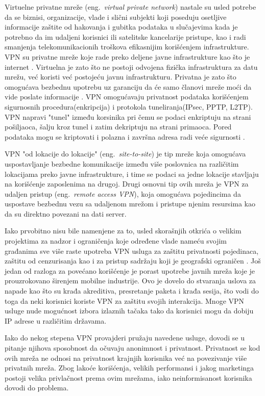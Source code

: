 \documentclass[a4paper]{article}
\begin{document}
Virtuelne privatne mreže (eng.~{\em virtual private network}) nastale su usled potrebe da se biznisi, organizacije, vlade i slični subjekti koji poseduju osetljive informacije zaštite od hakovanja i gubitka podataka u slučajevima kada je potrebno da im udaljeni korisnici ili satelitske kancelarije pristupe, kao i radi smanjenja telekomunikacionih troškova efikasnijim korišćenjem infrastrukture. VPN su privatne mreže koje rade preko deljene javne infrastrukture kao što je internet \cite{vpn2}. Virtuelna je zato što ne postoji odvojena fizička infrastruktura za datu mrežu, već koristi već postojeću javnu infrastrukturu. Privatna je zato što  omogućava bezbednu upotrebu uz garanciju da će samo članovi mreže moći da vide poslate informacije \cite{vpn3}. VPN omogućavaju privatnost podataka korišćenjem sigurnosnih procedura(enkripcija)  i  protokola tuneliranja(IPsec, PPTP, L2TP). VPN napravi "tunel"  između korsinika pri čemu se podaci enkriptuju na strani pošiljaoca, šalju kroz tunel i zatim dekriptuju na strani primaoca. Pored podataka mogu se kriptovati i polazna i završna adresa radi veće sigurnosti \cite{vpn4}. 
\par VPN "od lokacije do lokacije" (eng.~{\em site-to-site}) je tip mreže koja omogućava uspostavljanje bezbedne komunikacije između više poslovnica na različitim lokacijama preko javne infrastrukture, i time se podaci sa jedne lokacije stavljaju na korišćenje zaposlenima na drugoj. Drugi osnovni tip ovih mreža je VPN za udaljen pristup (eng.~{\em remote access VPN}), koja omogućava pojedincima da uspostave bezbednu vezu sa udaljenom mrežom i pristupe njenim resursima kao da su direktno povezani na dati server.
\par Iako prvobitno nisu bile namenjene za to, usled skorašnjih otkrića o velikim projektima za nadzor i ograničenja koje određene vlade nameću svojim građanima sve više raste upotreba VPN usluga za zaštitu privatnosti pojedinaca, zaštitu od cenzurisanja kao i za pristup sadržaju koji je geografski ograničen \cite{vpn5}. Još jedan od razloga za povećano korišćenje je  porast upotrebe javnih mreža koje je prouzrokovano širenjem mobilne industrije. Ovo je dovelo do stvaranja uslova za napade kao što su krađa akreditiva, presretanje paketa i krađa sesija, što vodi do toga da neki korisnici koriste VPN za zaštitu svojih interakcija. Mnoge VPN usluge nude mogućnost izbora izlaznih tačaka tako da korisnici mogu da dobiju IP adrese u različitim državama.
\par Iako do nekog stepena VPN provajderi pružaju navedene usluge, dovodi se u pitanje njihova sposobnost da očuvaju anonimnost i privatnost. Privatnost se kod ovih mreža ne odnosi na privatnost krajnjih korisnika već na povezivanje više privatnih mreža. Zbog lakoće korišćenja, velikih performansi i jakog marketinga postoji velika privlačnost prema ovim mrežama, iako neinformisanost korisnika dovodi do problema.
\end{document}
